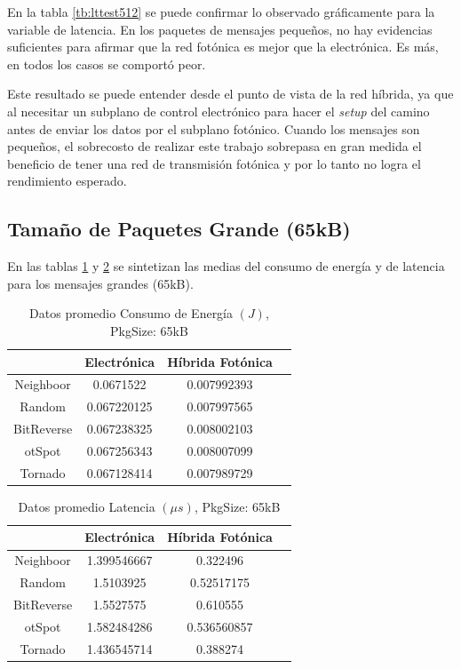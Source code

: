 \documentclass{IEEEtran}
\begin{document}
En la tabla \ref{tb:lttest512} se puede confirmar lo observado
gráficamente para la variable de 
latencia. En los paquetes de mensajes pequeños,
no hay evidencias suficientes para afirmar que la red fotónica
es mejor que la electrónica. Es más, en todos los casos se comportó peor.

Este resultado se puede entender desde el punto de vista de la red híbrida,
ya que al necesitar un subplano de control electrónico para hacer el \textit{setup} del
camino antes de enviar los datos por el subplano fotónico. Cuando los mensajes son
pequeños, el sobrecosto de realizar este trabajo sobrepasa en gran medida el 
beneficio de tener una red de transmisión fotónica \cite{shacham2008photonic} y por lo tanto no
logra el rendimiento esperado.

\subsection{Tamaño de Paquetes Grande (65kB)}

En las tablas \ref{tb:eall65k} y \ref{tb:lall65k} se sintetizan 
las medias del consumo de energía y de
latencia para los mensajes grandes (65kB).

\begin{table}[]
\centering
\begin{tabular}{|c|c|c|c|}
\hline
&Electrónica&Híbrida Fotónica\\
\hline
Neighboor&0.0671522&0.007992393\\
Random&0.067220125&0.007997565\\
BitReverse&0.067238325&0.008002103\\
otSpot&0.067256343&0.008007099\\
Tornado&0.067128414&0.007989729\\
\hline
\end{tabular}
\caption{Datos promedio Consumo de Energía $(J)$, PkgSize: 65kB}
\label{tb:eall65k}
\end{table}


\begin{table}[]
\centering
\begin{tabular}{|c|c|c|c|}
\hline
&Electrónica&Híbrida Fotónica\\
\hline
Neighboor&1.399546667&0.322496\\
Random&1.5103925&0.52517175\\
BitReverse&1.5527575&0.610555\\
otSpot&1.582484286&0.536560857\\
Tornado&1.436545714&0.388274\\
\hline
\end{tabular}
\caption{Datos promedio Latencia $(\mu s)$, PkgSize: 65kB}
\label{tb:lall65k}
\end{table}
\end{document}

